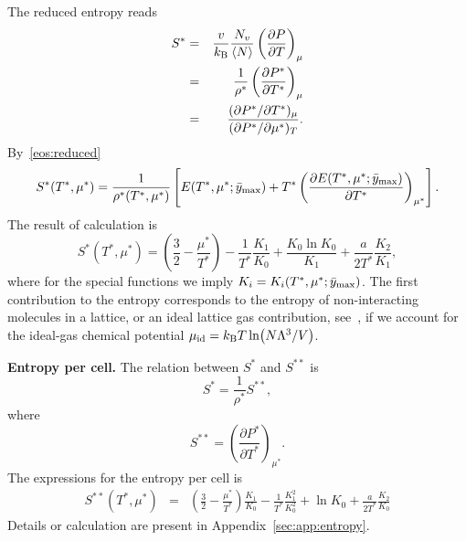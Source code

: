 \documentclass[12pt]{article}
\numberwithin{equation}{section}
\begin{document}
	
	The reduced entropy reads
	\begin{eqnarray}
		S^* & = & \frac{v}{k_{\rm B}} \frac{N_v}{\langle N \rangle} \left(\frac{\partial P}{\partial T}\right)_{\mu}
		\\
		& = & \frac{1}{\rho^*}\left(\frac{\partial P^*}{\partial T^*}\right)_{\mu}
		\\
		& = & \frac{(\partial P^* / \partial T^*)_{\mu}}{(\partial P^* / \partial \mu^*)_T}.
	\end{eqnarray}
	By~\eqref{eos:reduced}
	\begin{equation}
		\label{eq:entropy}
		S^*(T^*,\mu^*) = \frac{1}{\rho^*(T^*,\mu^*)} 
		\left[ 
		E(T^*,\mu^*;\bar{y}_{\rm max}) + T^* \left(\frac{\partial E(T^*,\mu^*;\bar{y}_{\rm max})}{\partial T^*}\right)_{\mu^*} 
		\right].
	\end{equation}
	The result of calculation is
	\begin{equation}
		\label{S_vs_T_mu}
		S^*(T^*,\mu^*) = \left(\frac{3}{2} - \frac{\mu^*}{T^*}\right) - \frac{1}{T^*}\frac{K_1}{K_0} + \frac{K_0 \ln K_0}{K_1} + \frac{a}{2T^*} \frac{K_2}{K_1},
	\end{equation}
	where for the special functions we imply $K_i = K_i(T^*,\mu^*;\bar{y}_{\rm max})$.
	The first contribution to the entropy corresponds to the entropy of non-interacting molecules in a lattice, or an ideal lattice gas contribution, see~\cite[(47.4)]{Hill56}, if we account for the ideal-gas chemical potential $\mu_{\rm id} = k_{\rm B}T \ln(N\Lambda^3/V)$. 
	
	
	\textbf{Entropy per cell.} The relation between $S^*$ and $S^{**}$ is
	\begin{equation}
		S^* = \frac{1}{\rho^*} S^{**},
	\end{equation}
	where
	\begin{equation}
		\label{eq:entropy2}
		S^{**}  = \left(\frac{\partial P^*}{\partial T^*}\right)_{\mu^*}.
	\end{equation}
	The expressions for the entropy per cell is
	\begin{eqnarray}
		S^{**}(T^*,\mu^*) & = & \left(\frac{3}{2} - \frac{\mu^*}{T^*}\right)\frac{K_1}{K_0} - \frac{1}{T^*}\frac{K_1^2}{K_0^2} + \ln K_0 + \frac{a}{2T^*} \frac{K_2}{K_0}
	\end{eqnarray}
	Details or calculation are present in Appendix~\ref{sec:app:entropy}.
	
\end{document}
